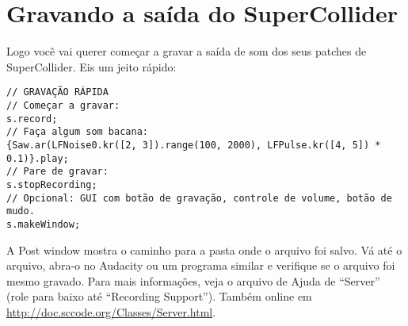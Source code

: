 \section{Gravando a saída do SuperCollider}

Logo você vai querer começar a gravar a saída de som dos seus patches de SuperCollider. Eis um jeito rápido:
 
\begin{lstlisting}[style=SuperCollider-IDE, basicstyle=\scttfamily\footnotesize]
// GRAVAÇÃO RÁPIDA
// Começar a gravar:
s.record;
// Faça algum som bacana:
{Saw.ar(LFNoise0.kr([2, 3]).range(100, 2000), LFPulse.kr([4, 5]) * 0.1)}.play;
// Pare de gravar:
s.stopRecording;
// Opcional: GUI com botão de gravação, controle de volume, botão de mudo.
s.makeWindow;
\end{lstlisting}
 
A Post window mostra o caminho para a pasta onde o arquivo foi salvo. Vá até o arquivo, abra-o no Audacity ou um programa similar e verifique se o arquivo foi mesmo gravado. Para mais informações, veja o arquivo de Ajuda de “Server” (role para baixo até “Recording Support”). Também online em \url{http://doc.sccode.org/Classes/Server.html}.
